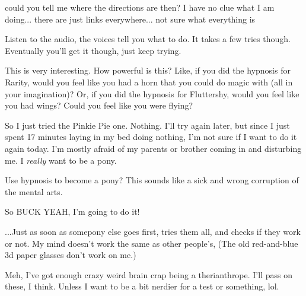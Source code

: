 \documentclass[ebook,12pt,oneside,openany]{memoir}
\begin{document}
\begin{tcolorbox}[title=Harmonic Revelations,colback=brown!5!white,colframe=brown!75!black,coltitle=white]
\begin{tcolorbox}[title=TheBronyHeart]
\par{could you tell me where the directions are then? I have no clue what I am doing... there are just links everywhere... not sure what everything is}
\end{tcolorbox}
\par{Listen to the audio, the voices tell you what to do. It takes a few tries though. Eventually you'll get it though, just keep trying.}
\end{tcolorbox}
\begin{tcolorbox}[title=SCS]
\par{This is very interesting. How powerful is this? Like, if you did the hypnosis for Rarity, would you feel like you had a horn that you could do magic with (all in your imagination)? Or, if you did the hypnosis for Fluttershy, would you feel like you had wings? Could you feel like you were flying?}
\end{tcolorbox}
\begin{tcolorbox}[title=Shining Wing,colback=blue!5!white,colframe=blue!75!black,coltitle=white]
\par{So I just tried the Pinkie Pie one. Nothing. I'll try again later, but since I just spent 17 minutes laying in my bed doing nothing, I'm not sure if I want to do it again today. I'm mostly afraid of my parents or brother coming in and disturbing me. I \textit{really} want to be a pony.}
\end{tcolorbox}
\begin{tcolorbox}[title=SilverStarApple]
\par{Use hypnosis to become a pony? This sounds like a sick and wrong corruption of the mental arts.}
\newline{}
\par{So BUCK YEAH, I'm going to do it!}
\newline{}
\par{...Just as soon as somepony else goes first, tries them all, and checks if they work or not. My mind doesn't work the same as other people's, (The old red-and-blue 3d paper glasses don't work on me.)}
\end{tcolorbox}
\begin{tcolorbox}[title=Discovery Dream]
\par{Meh, I've got enough crazy weird brain crap being a therianthrope. I'll pass on these, I think. Unless I want to be a bit nerdier for a test or something, lol.}
\end{tcolorbox}
\end{document}
